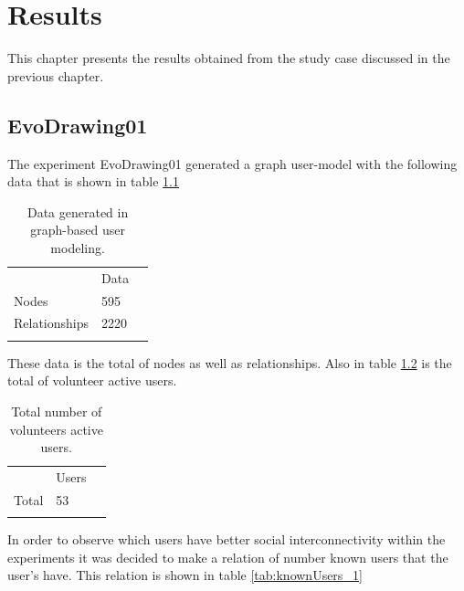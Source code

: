 \chapter{Results} \label{sec:6}
This chapter presents the results obtained from the study case discussed in the previous chapter.


\section{EvoDrawing01}

The experiment EvoDrawing01 generated a graph user-model with the following data that is shown in table
\ref{tab:dataGenerated_1}


\begin{table}
\small
\caption{Data generated in graph-based user modeling.}
\label{tab:dataGenerated_1} 
\centering
\small
\begin{tabular}{p{3cm} p{3cm} p{3cm} }
\hline\noalign{\smallskip}
  & Data &  \\
\noalign{\smallskip}\hline\noalign{\smallskip}
\small{Nodes} & \small{595} & \\ \hline  
\small{Relationships} & \small{2220} & \\ \hline  
  
\noalign{\smallskip}\hline
\end{tabular}
\end{table}


These data is the total of nodes as well as relationships. Also in
table \ref{tab:totalUsers_12} is the total of volunteer active users.

\begin{table}
\small
\caption{Total number of volunteers active users.}
\label{tab:totalUsers_12} 
\centering
\small
\begin{tabular}{p{3cm} p{3cm} p{3cm} }
\hline\noalign{\smallskip}
  & Users &  \\
\noalign{\smallskip}\hline\noalign{\smallskip}
\small{Total } & \small{53} & \\ \hline    
\noalign{\smallskip}\hline
\end{tabular}
\end{table}

In order to observe which users have better social interconnectivity within the
experiments it was decided to make a relation of number known users that the
user’s have. This relation is shown in table \ref{tab:knownUsers_1}

